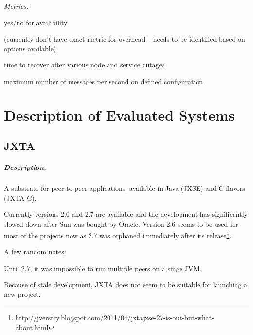 \documentclass[a4paper]{report}
\newenvironment{metrics}{\par\emph{Metrics:}\begin{compactitem}}{\end{compactitem}}
\begin{document}
\begin{metrics}

\item yes/no for availibility

\item (currently don't have exact metric for overhead -- needs to be identified
based on options available)

\item time to recover after various node and service outages

\item maximum number of messages per second on defined configuration

\end{metrics}







\chapter{Description of Evaluated Systems}

\section{JXTA}

\paragraph{Description.}

A substrate for peer-to-peer applications, available in Java (JXSE) and C
flavors (JXTA-C).

Currently versions 2.6 and 2.7 are available and the development has
significantly slowed down after Sun was bought by Oracle.  Version 2.6 seems to
be used for most of the projects now as 2.7 was orphaned immediately after its
release\footnote{\url{http://jverstry.blogspot.com/2011/04/jxtajxse-27-is-out-but-what-about.html}}.

A few random notes:

\begin{compactitem}

\item Until 2.7, it was impossible to run multiple peers on a singe JVM.

\item Because of stale development, JXTA does not seem to be suitable for
launching a new project.

\end{compactitem}
\end{document}
